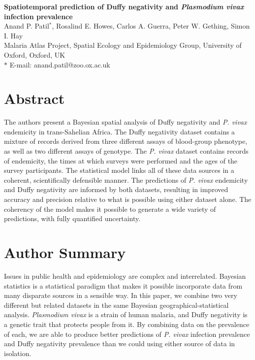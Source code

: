 \documentclass[10pt]{article}
\date{}
\begin{document}
\garamond

\begin{flushleft}
{\Large
\textbf{Spatiotemporal prediction of Duffy negativity and \emph{Plasmodium vivax} infection prevalence}
}
\\
Anand P. Patil$^{\ast}$,  
Rosalind E. Howes,
Carlos A. Guerra,
Peter W. Gething,
Simon I. Hay
\\
Malaria Atlas Project, Spatial Ecology and Epidemiology Group, University of Oxford, Oxford, UK
\\

$\ast$ E-mail: anand.patil@zoo.ox.ac.uk
\end{flushleft}

\section*{Abstract}

The authors present a Bayesian spatial analysis of Duffy negativity and \emph{P. vivax} endemicity in trans-Sahelian Africa. The Duffy negativity dataset contains a mixture of records derived from three different assays of blood-group phenotype, as well as two different assays of genotype. The \emph{P. vivax} dataset contains records of endemicity, the times at which surveys were performed and the ages of the survey participants. The statistical model links all of these data sources in a coherent, scientifically defensible manner. The predictions of \emph{P. vivax} endemicity and Duffy negativity are informed by both datasets, resulting in improved accuracy and precision relative to what is possible using either dataset alone. The coherency of the model makes it possible to generate a wide variety of predictions, with fully quantified uncertainty.

\section*{Author Summary}

Issues in public health and epidemiology are complex and interrelated. Bayesian statistics is a statistical paradigm that makes it possible incorporate data from many disparate sources in a sensible way. In this paper, we combine two very different but related datasets in the same Bayesian geographical-statistical analysis. \emph{Plasmodium vivax} is a strain of human malaria, and Duffy negativity is a genetic trait that protects people from it. By combining data on the prevalence of each, we are able to produce better predictions of \emph{P. vivax} infection prevalence and Duffy negativity prevalence than we could using either source of data in isolation.
\end{document}
